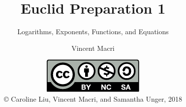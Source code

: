 

\title{Euclid Preparation 1}
\subtitle{Logarithms, Exponents, Functions, and Equations}
\author{Vincent Macri}
\date{\includegraphics{../LicenseLogo}\\\copyright{} Caroline Liu, Vincent Macri, and Samantha Unger, 2018}


	\frame{\titlepage}
	
	
	\tableofcontents

